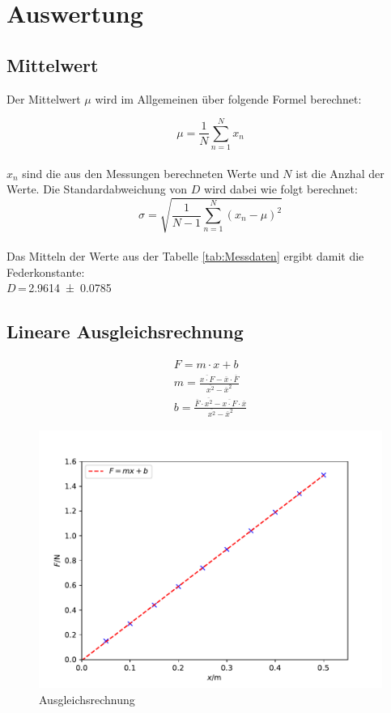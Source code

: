 \section{Auswertung}
\label{sec:Auswertung}

\subsection{Mittelwert}

Der Mittelwert $\mu$ wird im Allgemeinen über folgende Formel berechnet:

\begin{equation}
    \mu = \frac{1}{N} \sum_{n=1}^{N} x_n
\end{equation}
\\
$x_n$ sind die aus den Messungen berechneten Werte und $N$ ist die Anzhal der Werte. Die Standardabweichung von $D$ 
wird dabei wie folgt berechnet:
\\
\begin{equation}
    \sigma = \sqrt{\frac{1}{N-1}\sum_{n=1}^{N} (x_n -\mu)^2}
\end{equation}
\\
Das Mitteln der Werte aus der Tabelle \ref{tab:Messdaten} ergibt damit die Federkonstante:
\\
$D$\,=\,\num{2,9614+-0,0785}

\subsection{Lineare Ausgleichsrechnung}


    \begin{gather}
        F= m \cdot x + b \\ 
        m= \frac{\overline{x\cdot F}-\overline{x}\cdot \overline{F}}{\overline{x^2}-\overline{x}^2} \\ 
        b= \frac{\overline{F}\cdot \overline{x^2}-\overline{x\cdot F}\cdot \overline{x}}{\overline{x^2}-\overline{x}^2} 
    \end{gather}


\begin{figure}
    \centering
    \includegraphics[width=\textwidth]{Python_dateien/Plot_Ausgleichsrechnung.pdf}
    \caption{Ausgleichsrechnung}
\end{figure}


